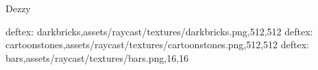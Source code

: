Dezzy

deftex: darkbricks,assets/raycast/textures/darkbricks.png,512,512
deftex: cartoonstones,assets/raycast/textures/cartoonstones.png,512,512
deftex: bars,assets/raycast/textures/bars.png,16,16
